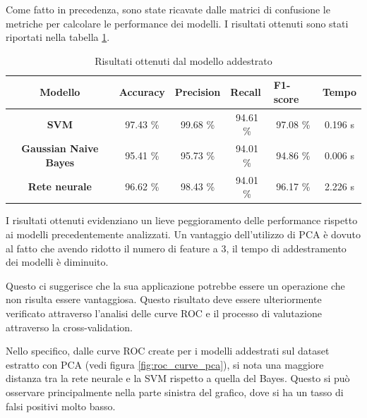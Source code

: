 Come fatto in precedenza, sono state ricavate dalle matrici di confusione le
metriche per calcolare le performance dei modelli. I risultati ottenuti sono stati
riportati nella tabella \ref{tab:risultati_pca}.
\begin{table}[!ht]
    \centering
    \begin{tabular}{@{}clllll@{}}
        \toprule
        \rowcolor[HTML]{EFEFEF}
        \textbf{Modello}                                      & \textbf{Accuracy}            & \textbf{Precision}           & \textbf{Recall}              & \textbf{F1-score}            & \textbf{Tempo}              \\ \midrule
        \cellcolor[HTML]{EFEFEF}\textbf{SVM}                  & \multicolumn{1}{c}{97.43 \%} & \multicolumn{1}{c}{99.68 \%} & \multicolumn{1}{c}{94.61 \%} & \multicolumn{1}{c}{97.08 \%} & \multicolumn{1}{c}{0.196 s} \\
        \cellcolor[HTML]{EFEFEF}\textbf{Gaussian Naive Bayes} & \multicolumn{1}{c}{95.41 \%} & \multicolumn{1}{c}{95.73 \%} & \multicolumn{1}{c}{94.01 \%} & \multicolumn{1}{c}{94.86 \%} & \multicolumn{1}{c}{0.006 s} \\
        \cellcolor[HTML]{EFEFEF}\textbf{Rete neurale}         & \multicolumn{1}{c}{96.62 \%} & \multicolumn{1}{c}{98.43 \%} & \multicolumn{1}{c}{94.01 \%} & \multicolumn{1}{c}{96.17 \%} & \multicolumn{1}{c}{2.226 s} \\ \bottomrule
    \end{tabular}
    \caption{Risultati ottenuti dal modello addestrato}
    \label{tab:risultati_pca}
\end{table}

I risultati ottenuti evidenziano un lieve peggioramento delle performance
rispetto ai modelli precedentemente analizzati. Un vantaggio dell'utilizzo di
PCA è dovuto al fatto che avendo ridotto il numero di feature a $3$, il tempo di
addestramento dei modelli è diminuito.

Questo ci suggerisce che la sua applicazione potrebbe essere un operazione che
non risulta essere vantaggiosa. Questo risultato deve essere ulteriormente
verificato attraverso l'analisi delle curve ROC e il processo di valutazione
attraverso la cross-validation.

Nello specifico, dalle curve ROC create per i modelli addestrati sul dataset
estratto con PCA (vedi figura \ref{fig:roc_curve_pca}), si nota una maggiore
distanza tra la rete neurale e la SVM rispetto a quella del Bayes.
Questo si può osservare principalmente nella parte sinistra del grafico, dove si
ha un tasso di falsi positivi molto basso.


